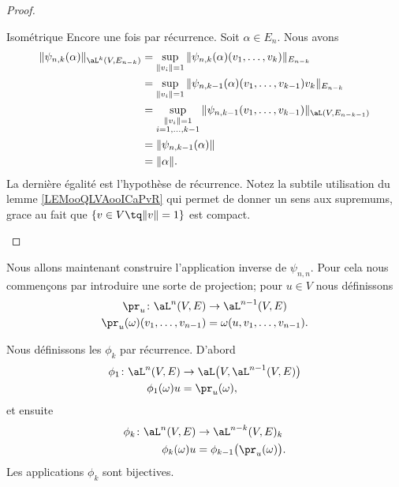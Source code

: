 \begin{proof}
\begin{subproof}
        \item[Isométrique]
            Encore une fois par récurrence. Soit \( \alpha\in E_n\). Nous avons
            \begin{subequations}
                \begin{align}
                    \| \psi_{n,k}(\alpha) \|_{\aL^k(V,E_{n-k})}&=\sup_{\| v_i \|=1}\| \psi_{n,k}(\alpha)(v_1,\ldots, v_k) \|_{E_{n-k}}\\
                    &=\sup_{\| v_i \|=1}\| \psi_{n,k-1}(\alpha)(v_1,\ldots, v_{k-1})v_k \|_{E_{n-k}}\\
                    &=\sup_{\substack{\| v_i \|=1\\i=1,\ldots, k-1}}\| \psi_{n,k-1}(v_1,\ldots, v_{k-1}) \|_{\aL(V,E_{n-k-1})}\\
                    &=\| \psi_{n,k-1}(\alpha) \|\\
                    &=\| \alpha \|.
                \end{align}
            \end{subequations}
            La dernière égalité est l'hypothèse de récurrence. Notez la subtile utilisation du lemme \ref{LEMooQLVAooICaPvR} qui permet de donner un sens aux supremums, grace au fait que \( \{ v\in V\tq \| v \|=1 \}\) est compact.
    \end{subproof}
\end{proof}

Nous allons maintenant construire l'application inverse de \( \psi_{n,n}\). Pour cela nous commençons par introduire une sorte de projection; pour \( u\in V\) nous définissons
\begin{equation}
    \begin{aligned}
        \pr_u\colon \aL^n(V,E)&\to \aL^{n-1}(V,E) \\
        \pr_u(\omega)(v_1,\ldots, v_{n-1})&=\omega(u,v_1,\ldots, v_{n-1}). 
    \end{aligned}
\end{equation}

\begin{lemma}
    Nous définissons les \( \phi_k\) par récurrence. D'abord
    \begin{equation}
        \begin{aligned}
            \phi_1\colon \aL^n(V,E)&\to \aL\big( V,\aL^{n-1}(V,E) \big) \\
            \phi_1(\omega)u&=\pr_u(\omega),
        \end{aligned}
    \end{equation}
    et ensuite
    \begin{equation}
        \begin{aligned}
            \phi_k\colon \aL^n(V,E)&\to \aL^{n-k}(V,E)_{k} \\
            \phi_k(\omega)u&=\phi_{k-1}\big( \pr_u(\omega) \big).
        \end{aligned}
    \end{equation}
    Les applications \( \phi_k\) sont bijectives.
\end{lemma}

